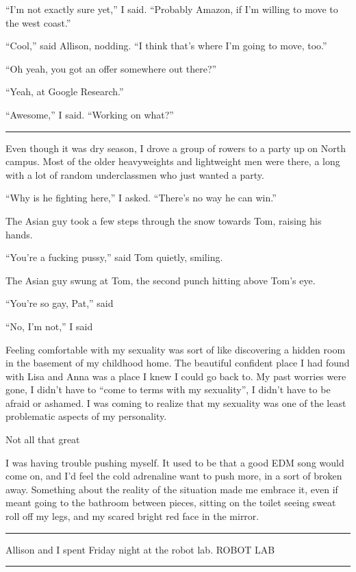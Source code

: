``I'm not exactly sure yet,'' I said.  ``Probably Amazon, if I'm willing to move
to the west coast.''

``Cool,'' said Allison, nodding.  ``I think that's where I'm going to move,
too.''

``Oh yeah, you got an offer somewhere out there?''

``Yeah, at Google Research.''

``Awesome,'' I said.  ``Working on what?''

\plainfancybreak{12pt}{2}{* * *}

Even though it was dry season, I drove a group of rowers to a party up on North
campus.  Most of the older heavyweights and lightweight men were there, a long
with a lot of random underclassmen who just wanted a party.

``Why is he fighting here,'' I asked.  ``There's no way he can win.'' 

The Asian guy took a few steps through the snow towards Tom, raising his hands.

``You're a fucking pussy,'' said Tom quietly, smiling. 

The Asian guy swung at Tom, the second punch hitting above Tom's eye.

``You're so gay, Pat,'' said 

``No, I'm not,'' I said

Feeling comfortable with my sexuality was sort of like discovering a hidden room
in the basement of my childhood home.  The beautiful confident place I had found
with Lisa and Anna was a place I knew I could go back to.  My past worries were
gone, I didn't have to ``come to terms with my sexuality'', I didn't have to be
afraid or ashamed.  I was coming to realize that my sexuality was one of the
least problematic aspects of my personality.
 
Not all that great

I was having trouble pushing myself.  It used to be that a good EDM song would
come on, and I'd feel the cold adrenaline want to push more, in a sort of broken
away.  Something about the reality of the situation made me embrace it, even if
meant going to the bathroom between pieces, sitting on the toilet seeing sweat
roll off my legs, and my scared bright red face in the mirror.  


\plainfancybreak{12pt}{2}{* * *}

Allison and I spent Friday night at the robot lab.
ROBOT LAB

\plainfancybreak{12pt}{2}{* * *}

